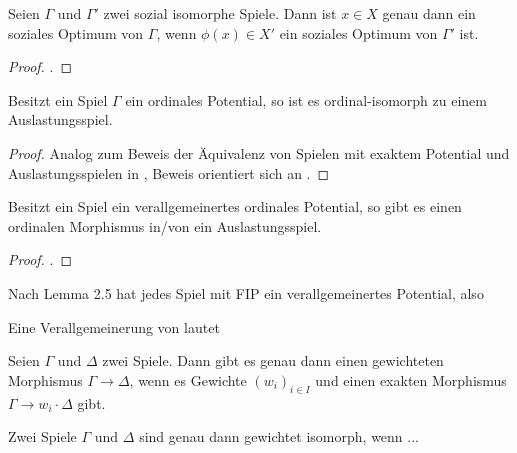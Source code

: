 \begin{lemma}
	Seien $\Gamma$ und $\Gamma'$ zwei sozial isomorphe Spiele. Dann ist $x \in X$ genau dann ein soziales Optimum von $\Gamma$, wenn $\phi(x) \in X'$ ein soziales Optimum von $\Gamma'$ ist.
\end{lemma}

\begin{proof}
	.
	
\end{proof}

\begin{satz}
	Besitzt ein Spiel $\Gamma$ ein ordinales Potential, so ist es ordinal-isomorph zu einem Auslastungsspiel.
\end{satz}

\begin{proof}
	Analog zum Beweis der Äquivalenz von Spielen mit exaktem Potential und Auslastungsspielen in \cite{MonShap}, Beweis orientiert sich an \cite{MultiPotGames}.
\end{proof}

\begin{beob}
	Besitzt ein Spiel ein verallgemeinertes ordinales Potential, so gibt es einen ordinalen Morphismus in/von  ein Auslastungsspiel.
\end{beob}

\begin{proof}
	.
\end{proof}

\begin{beob}
	Nach \cite{MonShap} Lemma 2.5 hat jedes Spiel mit FIP ein verallgemeinertes Potential, also 
\end{beob}


Eine Verallgemeinerung von  lautet

\begin{prop}
	Seien $\Gamma$ und $\Delta$ zwei Spiele. Dann gibt es genau dann einen gewichteten Morphismus $\Gamma \to \Delta$, wenn es Gewichte $(w_i)_{i\in I}$ und einen exakten Morphismus $\Gamma \to w_i \cdot \Delta$ gibt.
\end{prop}

\begin{kor}
	Zwei Spiele $\Gamma$ und $\Delta$ sind genau dann gewichtet isomorph, wenn ... 
\end{kor}